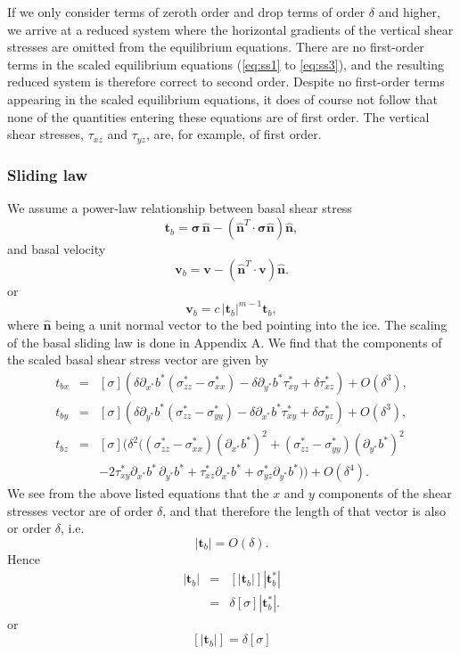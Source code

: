 \documentclass[10pt,a4paper]{book}
\newcommand{\p}{\partial}
\newcommand{\de}{\delta}
\newcommand{\txy}{\tau_{xy}}
\newcommand{\txz}{\tau_{xz}}
\newcommand{\tyz}{\tau_{yz}}
\newcommand{\sxx}{\sigma_{xx}}
\newcommand{\syy}{\sigma_{yy}}
\newcommand{\szz}{\sigma_{zz}}
\newcommand{\normal}{\hat{\bm{n}}}
\begin{document}
If we only consider terms of zeroth order and drop terms of order
$\de$ and higher, we arrive at a reduced system where the horizontal
gradients of the vertical shear stresses are omitted from the
equilibrium equations.  There are no first-order terms in the scaled
equilibrium equations (\eqref{eq:ss1} to \eqref{eq:ss3}), and the
resulting reduced system is therefore correct to second
order. Despite no first-order terms appearing in the scaled
equilibrium equations, it does of course not follow that none of the
quantities entering these equations are of first order. The vertical
shear stresses, $\txz$ and $\tyz$, are, for example, of
first order.


\subsubsection{Sliding law}
We assume a power-law relationship between basal shear stress
\[
\bm{t}_b=\bm{\sigma}\,
\normal-(\normal^T \cdot \bm{\sigma} \normal)
\normal ,\] 
and basal velocity
\[
\bm{v}_b=\bm{v}-(\normal^T \cdot \bm{v}) \normal .
\]
or
\begin{equation}
\bm{v}_b=c\,|\bm{t}_b|^{m-1} \bm{t}_b,
\label{eq:slidu}
\end{equation}
where $\normal$ being a unit normal vector to the bed pointing into
the ice. The scaling of the basal sliding law is done in Appendix A.
We find that the components of the scaled basal shear stress vector
are given by
\begin{eqnarray}
t_{bx}&=&[\sigma](\de \p_{x^*} b^* (\szz^*-\sxx^*)-\de \p_{y^*} b^* \txy^* + \de \txz^*) +O(\de^3)
\label{eq:tbx},\\
t_{by}&=&[\sigma] (\de \p_{y^*} b^* (\szz^*-\syy^*)-\de \p_{x^*} b^* \txy^* + \de \sigma_{yz}^*) +O(\de^3)
\label{eq:tby} ,\\
t_{bz}&=&[\sigma] (\de^2 ( (\szz^*-\sxx^*) (\p_{x^*} b^*)^2 + (\szz^*-\syy^*) (\p_{y^*} b^*)^2
\label{eq:tbz} \\
      & &-2 \txy^* \p_{x^*} b^* \,\p_{y^*} b^* + \txz^* \p_{x^*} b^* + \sigma_{yz}^* \p_{y^*} b^*)) +O(\de^4) .
\nonumber
\end{eqnarray}
We see from the above listed equations that the $x$ and $y$ components
of the shear stresses vector are of order $\de$, and that therefore the length of that vector is also or order $\de$, i.e.\ 
\begin{equation}
|\bm{t}_b|=O(\de).
\label{eq:tbs}
\end{equation}
Hence
\begin{eqnarray}
|\bm{t}_b|&=& [|\bm{t}_b|] |\bm{t}_b^*| \nonumber \\
&=& \de [\sigma] |\bm{t}_b^*| \nonumber .
\end{eqnarray}
or 
\[ 
[|\bm{t}_b|] = \de [\sigma] 
\]
\end{document}
